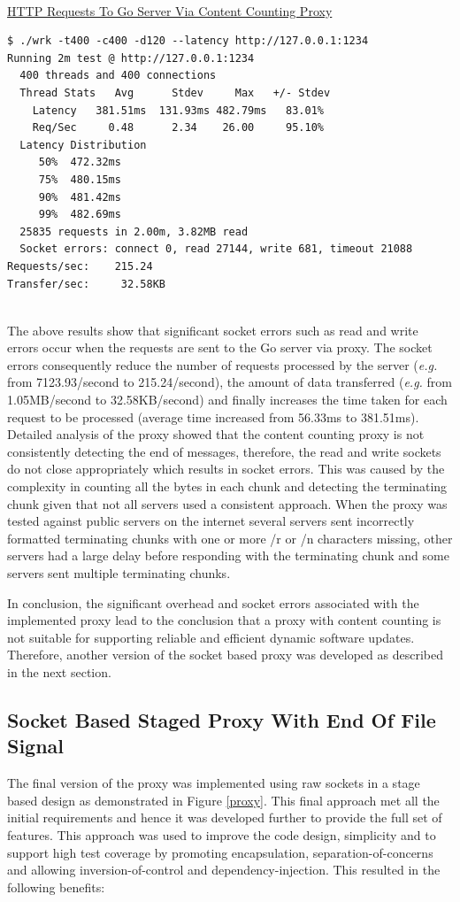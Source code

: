 \documentclass[a4paper,11pt,twoside]{report}
\begin{document}
\noindent\\
\underline{HTTP Requests To Go Server Via Content Counting Proxy} 
\begin{lstlisting}[language=terminal]
$ ./wrk -t400 -c400 -d120 --latency http://127.0.0.1:1234
Running 2m test @ http://127.0.0.1:1234
  400 threads and 400 connections
  Thread Stats   Avg      Stdev     Max   +/- Stdev
    Latency   381.51ms  131.93ms 482.79ms   83.01%
    Req/Sec     0.48      2.34    26.00     95.10%
  Latency Distribution
     50%  472.32ms
     75%  480.15ms
     90%  481.42ms
     99%  482.69ms
  25835 requests in 2.00m, 3.82MB read
  Socket errors: connect 0, read 27144, write 681, timeout 21088
Requests/sec:    215.24
Transfer/sec:     32.58KB
\end{lstlisting}


\noindent \\
The above results show that significant socket errors such as read and write errors occur when the requests are sent to the Go server via proxy. The socket errors consequently reduce the number of requests processed by the server (\textit{e.g.} from 7123.93/second to  215.24/second), the amount of data transferred (\textit{e.g.} from 1.05MB/second to 32.58KB/second) and finally increases the time taken for each request to be processed (average time increased from 56.33ms to 381.51ms). Detailed analysis of the proxy showed that the content counting proxy is not consistently detecting the end of messages, therefore, the read and write sockets do not close appropriately which results in socket errors.  This was caused by the complexity in counting all the bytes in each chunk and detecting the terminating chunk given that not all servers used a consistent approach.  When the proxy was tested against public servers on the internet several servers sent incorrectly formatted terminating chunks with one or more /r or /n characters missing, other servers had a large delay before responding with the terminating chunk and some servers sent multiple terminating chunks.

In conclusion, the significant overhead and socket errors associated with the implemented proxy lead to the conclusion that a proxy with content counting is not suitable for supporting reliable and efficient dynamic software updates. Therefore, another version of the socket based proxy was developed as described in the next section.

\subsection{Socket Based Staged Proxy With End Of File Signal}\label{staged}
The final version of the proxy was implemented using raw sockets in a stage based design as demonstrated in Figure \ref{proxy}. This final approach met all the initial requirements and hence it was developed further to provide the full set of features.  This approach was used to improve the code design, simplicity and to support high test coverage by promoting encapsulation, separation-of-concerns and allowing inversion-of-control and dependency-injection.  This resulted in the following benefits:
\end{document}
